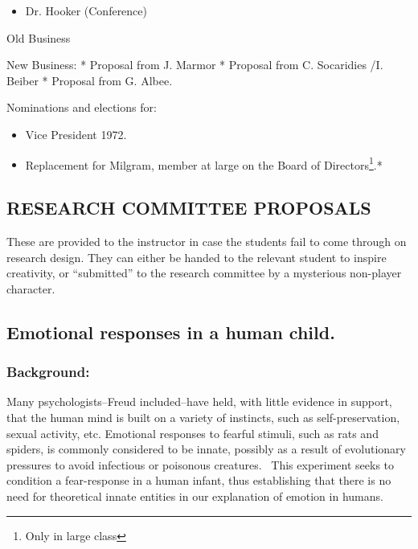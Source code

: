 {{\begin{itemize}
\item Dr. Hooker (Conference)

\end{itemize}

Old Business

New Business:
* Proposal from J. Marmor
 * Proposal from C. Socaridies \slash  I. Beiber
 * Proposal from G. Albee.

Nominations and elections for:

\begin{itemize}
\item Vice President 1972.

\item Replacement for Milgram, member at large on the Board of Directors\footnote{Only in large class}.*

\end{itemize}

 }%
}


 

\pagebreak 

\subsection{RESEARCH COMMITTEE PROPOSALS}
\label{researchcommitteeproposals}

These are provided to the instructor in case the students fail to come through on research design. They can either be handed to the relevant student to inspire creativity, or ``submitted'' to the research committee by a mysterious non-player character.

\newpage

\subsection{Emotional responses in a human child.}
\label{emotionalresponsesinahumanchild.}

\subsubsection{Background:}
\label{background:}

Many psychologists--Freud included--have held, with little evidence in support, that the human mind is built on a variety of instincts, such as self-preservation, sexual activity, etc. Emotional responses to fearful stimuli, such as rats and spiders, is commonly considered to be innate, possibly as a result of evolutionary pressures to avoid infectious or poisonous creatures.  This experiment seeks to condition a fear-response in a human infant, thus establishing that there is no need for theoretical innate entities in our explanation of emotion in humans.

